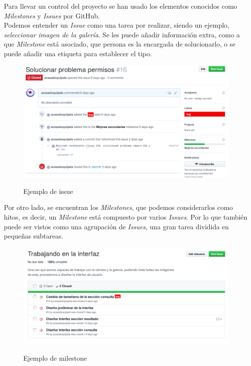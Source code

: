 Para llevar un control del proyecto se han usado los elementos conocidos como \textit{Milestones} y \textit{Issues} por GitHub.\\

Podemos entender un \textit{Issue} como una tarea por realizar, siendo un ejemplo, \textit{seleccionar imagen de la galería}. Se les puede añadir información extra, como a que \textit{Milestone} está asociado, que persona es la encargada de solucionarlo, o se puede añadir una etiqueta para establecer el tipo.\\

\begin{figure}[H] %
\centering
\includegraphics[scale=0.4]{imagenes/issue.png}  %
\label{issue.png}
\caption{Ejemplo de issue}
\end{figure}

Por otro lado, se encuentran los \textit{Milestones}, que podemos considerarlos como hitos, es decir, un \textit{Milestone} está compuesto por varios \textit{Issues}. Por lo que también puede ser vistos como una agrupación de \textit{Issues}, una gran tarea dividida en pequeñas subtareas.\\

\begin{figure}[H] %
\centering
\includegraphics[scale=0.4]{imagenes/milestone.png}  %
\label{milestone.png}
\caption{Ejemplo de milestone}
\end{figure}


